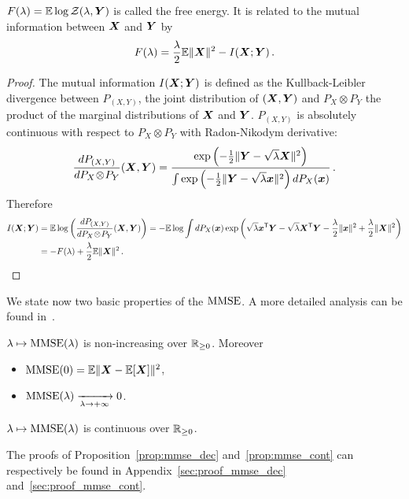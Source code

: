 \documentclass[12pt,nocut]{article}
\begin{document}
\begin{definition}
	$F(\lambda) = \mathbb{E} \log \mathcal{Z}(\lambda,{\boldsymbol Y})$ is called the free energy\footnotemark. It is related to the mutual information between ${\boldsymbol X}$ and ${\boldsymbol Y}$ by
	\begin{equation}\label{eq:f_i}
		F(\lambda) = \frac{\lambda}{2} \mathbb{E} \| {\boldsymbol X} \|^2 - I({\boldsymbol X};{\boldsymbol Y})\,.
	\end{equation}
\end{definition}
\begin{proof}
	The mutual information $I({\boldsymbol X};{\boldsymbol Y})$ is defined as the Kullback-Leibler divergence between $P_{(X,Y)}$, the joint distribution of $({\boldsymbol X},{\boldsymbol Y})$ and $P_X \! \otimes \! P_Y$ the product of the marginal distributions of ${\boldsymbol X}$ and ${\boldsymbol Y}$. $P_{(X,Y)}$ is absolutely continuous with respect to $P_X \otimes P_Y$ with Radon-Nikodym derivative:
	$$
	\frac{d P_{(X,Y)}}{d P_X \! \otimes \! P_Y}({\boldsymbol X},{\boldsymbol Y})
	=
	\frac{\exp\left(-\frac{1}{2}\| {\boldsymbol Y} - \sqrt{\lambda} {\boldsymbol X} \|^2\right)}{\int \exp\left(-\frac{1}{2}\| {\boldsymbol Y} - \sqrt{\lambda} {\boldsymbol x} \|^2\right) dP_X({\boldsymbol x})} \,.
	$$
	Therefore
	\begin{align*}
		I({\boldsymbol X};{\boldsymbol Y}) 
		&= \mathbb{E} \log\left( \frac{d P_{(X,Y)}}{d P_X \!\otimes \!P_Y}({\boldsymbol X},{\boldsymbol Y}) \right)
		= - \mathbb{E} \log \int dP_X({\boldsymbol x}) \exp \left( \sqrt{\lambda} {\boldsymbol x}^{{\sf T}} {\boldsymbol Y} - \sqrt{\lambda} {\boldsymbol X}^{{\sf T}} {\boldsymbol Y} - \frac{\lambda}{2} \|{\boldsymbol x}\|^2 + \frac{\lambda}{2}\|{\boldsymbol X}\|^2 \right)
		\\
		&= - F(\lambda) + \frac{\lambda}{2} \mathbb{E} \| {\boldsymbol X} \|^2 \,.
	\end{align*}
\end{proof}

We state now two basic properties of the ${{\rm MMSE}}$. A more detailed analysis can be found in~\cite{guo2011estimation,wu2012functional}.
\begin{proposition}\label{prop:mmse_dec}
	$\lambda \mapsto {{\rm MMSE}}(\lambda)$ is non-increasing over $\mathbb{R}_{\geq 0}$. 
	Moreover
	\begin{itemize}
		\item ${{\rm MMSE}}(0) = \mathbb{E}\|{\boldsymbol X} - \mathbb{E}[{\boldsymbol X}]\|^2$,
		\item ${{\rm MMSE}}(\lambda) \xrightarrow[\lambda \to +\infty]{} 0$.
	\end{itemize}
\end{proposition}
\begin{proposition}\label{prop:mmse_cont}
	$\lambda \mapsto {{\rm MMSE}}(\lambda)$ is continuous over $\mathbb{R}_{\geq 0}$.
\end{proposition}
The proofs of Proposition~\ref{prop:mmse_dec} and~\ref{prop:mmse_cont} can respectively be found in Appendix~\ref{sec:proof_mmse_dec} and~\ref{sec:proof_mmse_cont}.
\\
\end{document}
